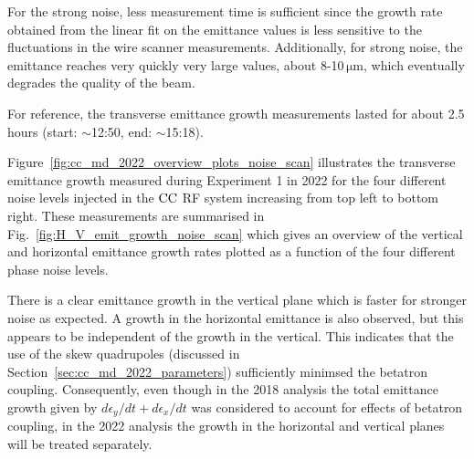 For the strong noise, less measurement time is sufficient since the growth rate obtained from the linear fit on the emittance values is less sensitive to the fluctuations in the wire scanner measurements. Additionally, for strong noise, the emittance reaches very quickly very large values, about 8-10\,$\mathrm{\mu m}$, which eventually degrades the quality of the beam.

For reference, the transverse emittance growth measurements lasted for about 2.5\,hours (start: $\sim$12:50, end: $\sim$15:18).

Figure~\ref{fig:cc_md_2022_overview_plots_noise_scan} illustrates the transverse emittance growth measured during Experiment 1 in 2022 for the four different noise levels injected in the ${\mathrm{CC}}$ RF system increasing from top left to bottom right. These measurements are summarised in Fig.~\ref{fig:H_V_emit_growth_noise_scan} which gives an overview of the vertical and horizontal emittance growth rates plotted as a function of the four different phase noise levels. 

There is a clear emittance growth in the vertical plane which is faster for stronger noise as expected. A growth in the horizontal emittance is also observed, but this appears to be independent of the growth in the vertical. This indicates that the use of the skew quadrupoles (discussed in Section~\ref{sec:cc_md_2022_parameters}) sufficiently minimsed the betatron coupling. Consequently, even though in the 2018 analysis the total emittance growth given by $d\epsilon_y/dt +d\epsilon_x/dt $ was considered to account for effects of betatron coupling, in the 2022 analysis the growth in the horizontal and vertical planes will be treated separately.


